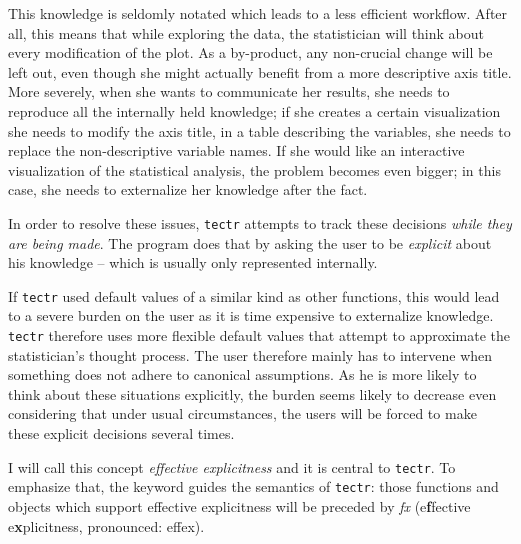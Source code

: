 \documentclass[]{report}
\theoremstyle{definition}
\theoremstyle{definition}
\theoremstyle{definition}
\theoremstyle{remark}
\begin{document}
This knowledge is seldomly notated which leads to a less efficient
workflow. After all, this means that while exploring the data, the
statistician will think about every modification of the plot. As a
by-product, any non-crucial change will be left out, even though she
might actually benefit from a more descriptive axis title. More
severely, when she wants to communicate her results, she needs to
reproduce all the internally held knowledge; if she creates a certain
visualization she needs to modify the axis title, in a table describing
the variables, she needs to replace the non-descriptive variable names.
If she would like an interactive visualization of the statistical
analysis, the problem becomes even bigger; in this case, she needs to
externalize her knowledge after the fact.

In order to resolve these issues, \texttt{tectr} attempts to track these
decisions \emph{while they are being made}. The program does that by
asking the user to be \emph{explicit} about his knowledge -- which is
usually only represented internally.

If \texttt{tectr} used default values of a similar kind as other
functions, this would lead to a severe burden on the user as it is time
expensive to externalize knowledge. \texttt{tectr} therefore uses more
flexible default values that attempt to approximate the statistician's
thought process. The user therefore mainly has to intervene when
something does not adhere to canonical assumptions. As he is more likely
to think about these situations explicitly, the burden seems likely to
decrease even considering that under usual circumstances, the users will
be forced to make these explicit decisions several times.

I will call this concept \emph{effective explicitness} and it is central
to \texttt{tectr}. To emphasize that, the keyword guides the semantics
of \texttt{tectr}: those functions and objects which support effective
explicitness will be preceded by \emph{fx} (e\textbf{f}fective
e\textbf{x}plicitness, pronounced: effex).
\end{document}
